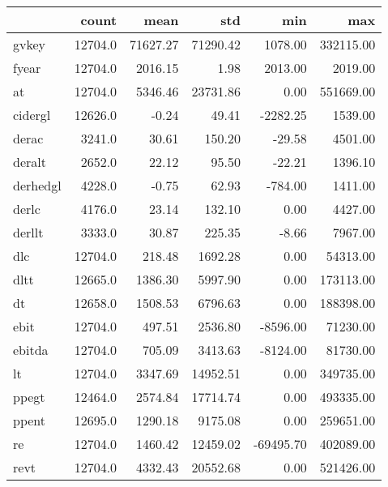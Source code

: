 \begin{tabular}{lrrrrr}
\toprule
{} &    count &      mean &       std &        min &         max \\
\midrule
gvkey                   &  12704.0 &  71627.27 &  71290.42 &    1078.00 &   332115.00 \\
fyear                   &  12704.0 &   2016.15 &      1.98 &    2013.00 &     2019.00 \\
at                      &  12704.0 &   5346.46 &  23731.86 &       0.00 &   551669.00 \\
cidergl                 &  12626.0 &     -0.24 &     49.41 &   -2282.25 &     1539.00 \\
derac                   &   3241.0 &     30.61 &    150.20 &     -29.58 &     4501.00 \\
deralt                  &   2652.0 &     22.12 &     95.50 &     -22.21 &     1396.10 \\
derhedgl                &   4228.0 &     -0.75 &     62.93 &    -784.00 &     1411.00 \\
derlc                   &   4176.0 &     23.14 &    132.10 &       0.00 &     4427.00 \\
derllt                  &   3333.0 &     30.87 &    225.35 &      -8.66 &     7967.00 \\
dlc                     &  12704.0 &    218.48 &   1692.28 &       0.00 &    54313.00 \\
dltt                    &  12665.0 &   1386.30 &   5997.90 &       0.00 &   173113.00 \\
dt                      &  12658.0 &   1508.53 &   6796.63 &       0.00 &   188398.00 \\
ebit                    &  12704.0 &    497.51 &   2536.80 &   -8596.00 &    71230.00 \\
ebitda                  &  12704.0 &    705.09 &   3413.63 &   -8124.00 &    81730.00 \\
lt                      &  12704.0 &   3347.69 &  14952.51 &       0.00 &   349735.00 \\
ppegt                   &  12464.0 &   2574.84 &  17714.74 &       0.00 &   493335.00 \\
ppent                   &  12695.0 &   1290.18 &   9175.08 &       0.00 &   259651.00 \\
re                      &  12704.0 &   1460.42 &  12459.02 &  -69495.70 &   402089.00 \\
revt                    &  12704.0 &   4332.43 &  20552.68 &       0.00 &   521426.00 \\

\end{tabular}
